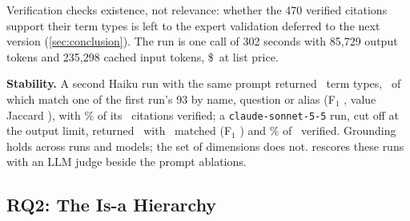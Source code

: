 Verification checks existence, not relevance: whether the 470 verified
citations support their term types is left to the expert validation deferred
to the next version (\cref{sec:conclusion}). The run is one call of 302
seconds with 85,729 output tokens and 235,298 cached input tokens,
\$\BillTaskA\ at list price.

\textbf{Stability.} A second Haiku run with the same prompt returned
\AgHTypes\ term types, \AgHMatched\ of which match one of the first run's 93
by name, question or alias (F$_1$ \AgHF, value Jaccard \AgHJaccard), with
\AgHVerifiedPct\% of its \AgHCites\ citations verified; a
\texttt{claude-sonnet-5-5} run, cut off at the output limit, returned
\AgSTypes\ with \AgSMatched\ matched (F$_1$ \AgSF) and \AgSVerifiedPct\% of
\AgSCites\ verified. Grounding holds across runs and models; the set of
dimensions does not.  rescores these runs with an LLM judge
beside the prompt ablations.

\subsection{RQ2: The Is-a Hierarchy}
\label{sec:exp:rq2}

\begin{table}[t]
  \centering
  \caption{The is-a DAG by category after consolidation, no weight threshold.
  Bits/desc.\ is the information gain of a random root-to-leaf descent;
  E[depth] its expected length; AUC the area under the reach-a-leaf curve (1 when
  every root is a leaf); Eff.\,lv.\ is the effective number of leaves
  $2^{\entropy(r)}$ for the leaf-reach distribution $r$. Single run.}
  \label{tab:taskb}
  \scriptsize
  
\end{table}


